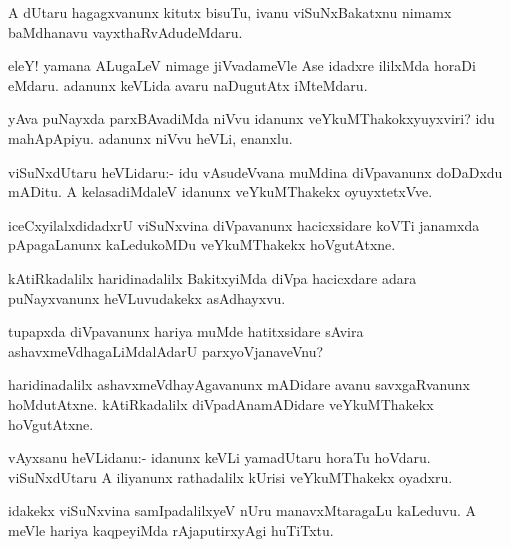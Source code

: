 \begin{mng}
A dUtaru hagagxvanunx kitutx bisuTu, ivanu viSuNxBakatxnu nimamx baMdhanavu vayxthaRvAdudeMdaru.
\end{mng}

\begin{mng}
eleY! yamana ALugaLeV nimage jiVvadameVle Ase idadxre ililxMda horaDi eMdaru. adanunx keVLida avaru naDugutAtx iMteMdaru.
\end{mng}

\begin{mng}
yAva puNayxda parxBAvadiMda niVvu idanunx veYkuMThakokxyuyxviri? idu mahApApiyu. adanunx niVvu heVLi, enanxlu.
\end{mng}

\begin{mng}
viSuNxdUtaru heVLidaru:- idu vAsudeVvana muMdina diVpavanunx doDaDxdu mADitu. A kelasadiMdaleV idanunx veYkuMThakekx oyuyxtetxVve.
\end{mng}

\begin{mng}
iceCxyilalxdidadxrU viSuNxvina diVpavanunx hacicxsidare koVTi janamxda pApagaLanunx kaLedukoMDu veYkuMThakekx hoVgutAtxne.
\end{mng}

\begin{mng}
kAtiRkadalilx haridinadalilx BakitxyiMda diVpa hacicxdare adara puNayxvanunx heVLuvudakekx asAdhayxvu.
\end{mng}

\begin{mng}
tupapxda diVpavanunx hariya muMde hatitxsidare sAvira ashavxmeVdhagaLiMdalAdarU parxyoVjanaveVnu?
\end{mng}

\begin{mng}
haridinadalilx ashavxmeVdhayAgavanunx mADidare avanu savxgaRvanunx hoMdutAtxne. kAtiRkadalilx diVpadAnamADidare veYkuMThakekx hoVgutAtxne.
\end{mng}

\begin{mng}
vAyxsanu heVLidanu:- idanunx keVLi yamadUtaru horaTu hoVdaru. viSuNxdUtaru A iliyanunx rathadalilx kUrisi veYkuMThakekx oyadxru.
\end{mng}

\begin{mng}
idakekx viSuNxvina samIpadalilxyeV nUru manavxMtaragaLu kaLeduvu. A meVle hariya kaqpeyiMda rAjaputirxyAgi huTiTxtu.
\end{mng}


